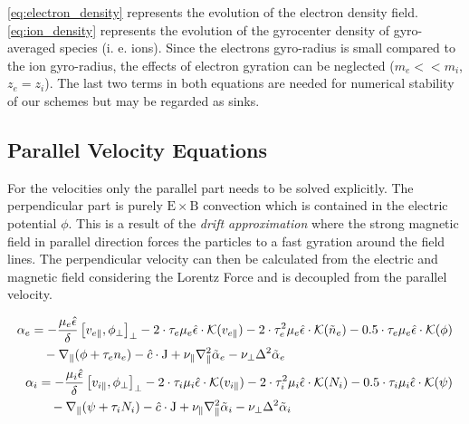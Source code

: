 \documentclass[master.tex]{subfiles}
\begin{document}
\autoref{eq:electron_density} represents the evolution of the electron density field.
\autoref{eq:ion_density} represents the evolution of the gyrocenter density of gyro-averaged species (i. e. ions). Since the electrons gyro-radius is small compared to the ion gyro-radius, the effects of electron gyration can be neglected ($m_e << m_i$, $z_e = z_i$). \newline
The last two terms in both equations are needed for numerical stability of our schemes but may be regarded as sinks.


\subsection{Parallel Velocity Equations}
For the velocities only the parallel part needs to be solved explicitly. The perpendicular part is purely $\mathrm{E}\times \mathrm{B}$ convection which is contained in the electric potential $\phi$. This is a result of the \textit{drift approximation} where the strong magnetic field in parallel direction forces the particles to a fast gyration around the field lines. The perpendicular velocity can then be calculated from the electric and magnetic field considering the Lorentz Force and is decoupled from the parallel velocity.


\begin{align}
\begin{split}
    \alpha_e &=  -\frac{\mu_e \hat{\epsilon}}{\delta} \left[v_{e\parallel}, \phi_\perp\right]_\perp
    - 2 \cdot \tau_e \mu_e \hat{\epsilon} \cdot \mathcal{K}( v_{e\parallel})
    - 2 \cdot \tau_e^2 \mu_e \hat{\epsilon} \cdot \mathcal{K}(\Tilde{n}_e)
    - 0.5 \cdot \tau_e \mu_e \hat{\epsilon} \cdot \mathcal{K}( \phi)\\
    & \quad - \nabla_\parallel (\phi + \tau_e n_e)
    - \hat{c} \cdot \mathrm{J}
    + \nu_\parallel \nabla_\parallel^2\Tilde{\alpha}_e 
    - \nu_\perp \Delta^2\Tilde{\alpha}_e \label{eq:electron_velocity}
\end{split}\\
\begin{split}
    \alpha_i &= -\frac{\mu_i \hat{\epsilon}}{\delta}  \left[v_{i\parallel}, \phi_\perp\right]_\perp
    - 2 \cdot \tau_i \mu_i \hat{\epsilon} \cdot \mathcal{K}(v_{i\parallel})
    - 2 \cdot \tau_i^2 \mu_i \hat{\epsilon} \cdot \mathcal{K}(N_i)
    - 0.5 \cdot \tau_i \mu_i \hat{\epsilon} \cdot \mathcal{K}(\psi)\\
    &\quad - \nabla_\parallel (\psi + \tau_i N_i)
    - \hat{c} \cdot  \mathrm{J}
    + \nu_\parallel\nabla_\parallel^2\Tilde{\alpha}_i 
    - \nu_\perp \Delta^2\Tilde{\alpha}_i \label{eq:ion_velocity}
\end{split}
\end{align}
\end{document}
